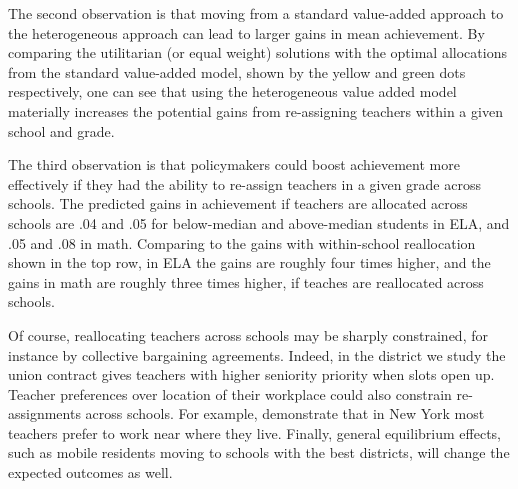 \documentclass[12pt]{article}
\theoremstyle{definition}
\theoremstyle{definition}
\theoremstyle{definition}
\theoremstyle{definition}
\begin{document}
 The second observation is that moving from a standard value-added approach to the heterogeneous approach can lead to larger gains in mean achievement. By comparing the utilitarian (or equal weight) solutions with the optimal allocations from the standard value-added model, shown by the yellow and green dots respectively, one can see that using the heterogeneous value added model materially increases the potential gains from re-assigning teachers within a given school and grade. 
 
 The third observation is that policymakers could boost achievement more effectively if they had the ability to re-assign teachers in a given grade across schools. The predicted gains in achievement if teachers are allocated across schools are .04 and .05 for below-median and above-median students in ELA, and .05 and .08 in math. Comparing to the gains with within-school reallocation shown in the top row, in ELA the gains are roughly four times higher, and the gains in math are roughly three times higher, if teaches are reallocated across schools. 

 Of course, reallocating teachers across schools may be sharply constrained, for instance by collective bargaining agreements. Indeed, in the district we study the union contract gives teachers with higher seniority priority when slots open up. Teacher preferences over location of their workplace could also constrain re-assignments across schools. For example, \citep{boyd2005a} demonstrate that in New York most teachers prefer to work near where they live. Finally, general equilibrium effects, such as mobile residents moving to schools with the best districts, will change the expected outcomes as well. 


 
\end{document}
